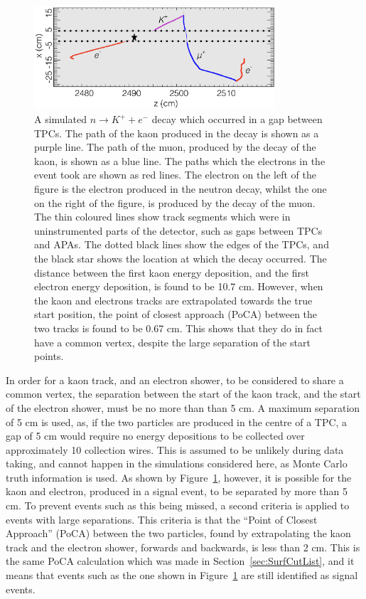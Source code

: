 \begin{figure}
  \centering
  \includegraphics[width=0.8\textwidth]{KaonElecBigGap}
  \caption[A simulated $n \rightarrow K^{+} + e^{-}$ decay which occurred in a gap between TPCs]
          {A simulated $n \rightarrow K^{+} + e^{-}$ decay which occurred in a gap between TPCs. The path of the kaon produced in the decay is shown as a purple line. The path of the muon, produced by the decay of the kaon, is shown as a blue line. The paths which the electrons in the event took are shown as red lines. The electron on the left of the figure is the electron produced in the neutron decay, whilst the one on the right of the figure, is produced by the decay of the muon. The thin coloured lines show track segments which were in uninstrumented parts of the detector, such as gaps between TPCs and APAs. The dotted black lines show the edges of the TPCs, and the black star shows the location at which the decay occurred. The distance between the first kaon energy deposition, and the first electron energy deposition, is found to be 10.7 cm. However, when the kaon and electrons tracks are extrapolated towards the true start position, the point of closest approach (PoCA) between the two tracks is found to be 0.67 cm. This shows that they do in fact have a common vertex, despite the large separation of the start points.} 
  \label{fig:NDK_Sig_KEBigGap}
\end{figure}

In order for a kaon track, and an electron shower, to be considered to share a common vertex, the separation between the start of the kaon track, and the start of the electron shower, must be no more than than 5 cm. A maximum separation of 5 cm is used, as, if the two particles are produced in the centre of a TPC, a gap of 5 cm would require no energy depositions to be collected over approximately 10 collection wires. This is assumed to be unlikely during data taking, and cannot happen in the simulations considered here, as Monte Carlo truth information is used. As shown by Figure~\ref{fig:NDK_Sig_KEBigGap}, however, it is possible for the kaon and electron, produced in a signal event, to be separated by more than 5 cm. To prevent events such as this being missed, a second criteria is applied to events with large separations. This criteria is that the ``Point of Closest Approach'' (PoCA) between the two particles, found by extrapolating the kaon track and the electron shower, forwards and backwards, is less than 2 cm. This is the same PoCA calculation which was made in Section~\ref{sec:SurfCutList}, and it means that events such as the one shown in Figure~\ref{fig:NDK_Sig_KEBigGap} are still identified as signal events. \\

